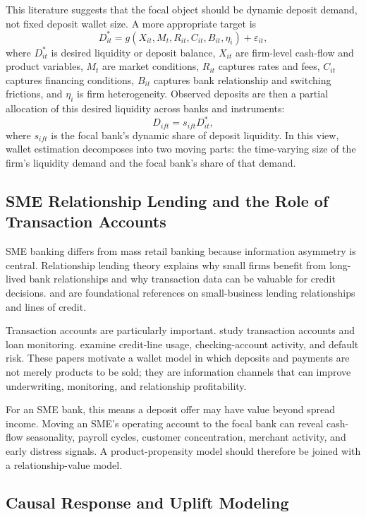 \documentclass[11pt]{article}
\begin{document}
This literature suggests that the focal object should be dynamic deposit demand,
not fixed deposit wallet size. A more appropriate target is
\[
  D_{it}^{*}
  =
  g(X_{it}, M_t, R_{it}, C_{it}, B_{it}, \eta_i) + \varepsilon_{it},
\]
where $D_{it}^{*}$ is desired liquidity or deposit balance, $X_{it}$ are
firm-level cash-flow and product variables, $M_t$ are market conditions, $R_{it}$
captures rates and fees, $C_{it}$ captures financing conditions, $B_{it}$
captures bank relationship and switching frictions, and $\eta_i$ is firm
heterogeneity. Observed deposits are then a partial allocation of this
desired liquidity across banks and instruments:
\[
  D_{ift} = s_{ift} D_{it}^{*},
\]
where $s_{ift}$ is the focal bank's dynamic share of deposit liquidity. In this
view, wallet estimation decomposes into two moving parts: the time-varying size
of the firm's liquidity demand and the focal bank's share of that demand.

\subsection{SME Relationship Lending and the Role of Transaction Accounts}

SME banking differs from mass retail banking because information asymmetry is
central. Relationship lending theory explains why small firms benefit from
long-lived bank relationships and why transaction data can be valuable for
credit decisions. \citet{petersen1994benefits} and
\citet{berger1995relationship} are foundational references on small-business
lending relationships and lines of credit.

Transaction accounts are particularly important. \citet{mester2007transactions}
study transaction accounts and loan monitoring. \citet{norden2010creditline}
examine credit-line usage, checking-account activity, and default risk. These
papers motivate a wallet model in which deposits and payments are not merely
products to be sold; they are information channels that can improve underwriting,
monitoring, and relationship profitability.

For an SME bank, this means a deposit offer may have value beyond spread income.
Moving an SME's operating account to the focal bank can reveal cash-flow
seasonality, payroll cycles, customer concentration, merchant activity, and early
distress signals. A product-propensity model should therefore be joined with a
relationship-value model.

\subsection{Causal Response and Uplift Modeling}
\end{document}
